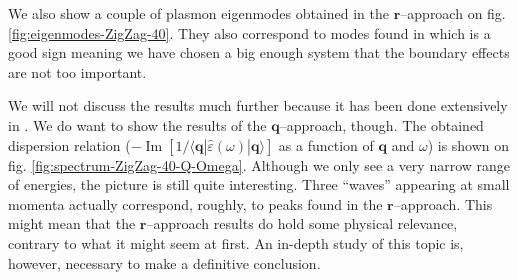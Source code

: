 \documentclass[a4paper,12pt]{article}
\begin{document}
    We also show a couple of plasmon eigenmodes obtained in the $\mathbf{r}$--approach on fig. \ref{fig:eigenmodes-ZigZag-40}. They also correspond to modes found in \cite{plasmonic2015} which is a good sign meaning we have chosen a big enough system that the boundary effects are not too important.

    We will not discuss the results much further because it has been done extensively in \cite{plasmonic2015}. We do want to show the results of the $\mathbf{q}$--approach, though. The obtained dispersion relation ($-\operatorname{Im}[1 / \langle\mathbf{q}| \hat\varepsilon(\omega) |\mathbf{q}\rangle]$ as a function of $\mathbf{q}$ and $\omega$) is shown on fig. \ref{fig:spectrum-ZigZag-40-Q-Omega}. Although we only see a very narrow range of energies, the picture is still quite interesting. Three ``waves'' appearing at small momenta actually correspond, roughly, to peaks found in the $\mathbf{r}$--approach. This might mean that the $\mathbf{r}$--approach results do hold some physical relevance, contrary to what it might seem at first. An in-depth study of this topic is, however, necessary to make a definitive conclusion.
\end{document}
